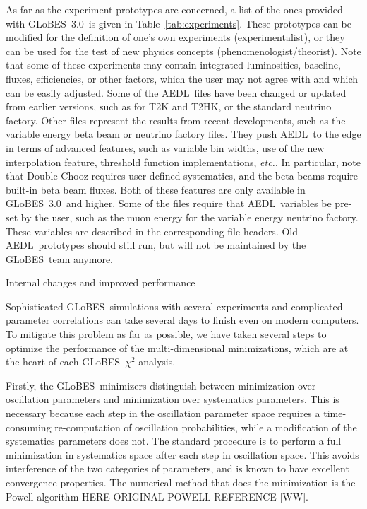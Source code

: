 \documentclass[12pt,a4paper]{article}
\makeatletter
\renewcommand{\section}{\@startsection{section}{1}{0em}{-\baselineskip}%
{\baselineskip}{\normalfont\large\bfseries}}
\newcommand{\etc}{{\it etc.}}
\newcommand{\Tab}{Table}
\newcommand{\GLOBES}{{\sf GLoBES}}
\newcommand{\GLOBESN}{{\sf GLoBES~3.0}}
\newcommand{\AEDL}{{\sf AEDL}}
\makeatother
\begin{document}
As far as the experiment prototypes are concerned, a list of the ones provided with \GLOBESN\ 
is given in \Tab~\ref{tab:experiments}. These prototypes can be modified for the definition of
one's own experiments (experimentalist), or they can be used for the test of new physics concepts
(phenomenologist/theorist).
Note that some of these experiments may contain 
integrated luminosities, baseline, fluxes, efficiencies, or other factors, which the user
may not agree with and which can be easily adjusted. Some of the \AEDL\ files have been
changed or updated from earlier versions, such as for T2K and T2HK, or the standard neutrino
factory. Other files represent the results from recent developments, such as the variable energy
beta beam or neutrino factory files. They push \AEDL\ to the edge in terms of advanced features,
such as variable bin widths, use of the new interpolation feature, threshold function implementations, \etc.
In particular, note that Double Chooz requires user-defined
systematics, and the beta beams require built-in beta beam fluxes. Both of these features are only
available in \GLOBESN\ and higher. Some of the files require that \AEDL\ variables be pre-set by the
user, such as the muon energy for the variable energy neutrino factory. These variables are
described in the corresponding file headers. Old \AEDL\ prototypes should still run, but will not
be maintained by the \GLOBES\ team anymore.

\section{Internal changes and improved performance}


Sophisticated \GLOBES\ simulations with several experiments and complicated
parameter correlations can take several days to finish even on modern computers.
To mitigate this problem as far as possible, we have taken several steps to
optimize the performance of the multi-dimensional minimizations, which are at
the heart of each \GLOBES\ $\chi^2$ analysis.

Firstly, the \GLOBES\ minimizers distinguish between minimization over
oscillation parameters and minimization over systematics parameters.
This is necessary because each step in the oscillation parameter space
requires a time-consuming re-computation of oscillation probabilities,
while a modification of the systematics parameters does not. The standard
procedure is to perform a full minimization in systematics space after each
step in oscillation space. This avoids interference of the two categories
of parameters, and is known to have excellent convergence properties.
The numerical method that does the minimization is the Powell
algorithm HERE ORIGINAL POWELL REFERENCE [WW].
\end{document}

